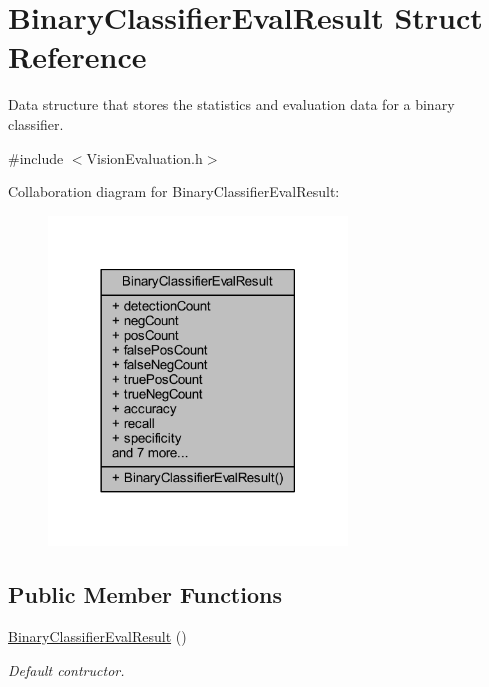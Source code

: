 \hypertarget{struct_vision_core_1_1_evaluation_1_1_binary_classifier_eval_result}{}\section{Binary\+Classifier\+Eval\+Result Struct Reference}
\label{struct_vision_core_1_1_evaluation_1_1_binary_classifier_eval_result}


Data structure that stores the statistics and evaluation data for a binary classifier.  




{\ttfamily \#include $<$Vision\+Evaluation.\+h$>$}



Collaboration diagram for Binary\+Classifier\+Eval\+Result\+:
\nopagebreak
\begin{figure}[H]
\begin{center}
\leavevmode
\includegraphics[width=225pt]{struct_vision_core_1_1_evaluation_1_1_binary_classifier_eval_result__coll__graph}
\end{center}
\end{figure}
\subsection*{Public Member Functions}
\begin{DoxyCompactItemize}
\item 
\hypertarget{struct_vision_core_1_1_evaluation_1_1_binary_classifier_eval_result_a56ffb62efd16fc45f18938e1fcdb2375}{}\hyperlink{struct_vision_core_1_1_evaluation_1_1_binary_classifier_eval_result_a56ffb62efd16fc45f18938e1fcdb2375}{Binary\+Classifier\+Eval\+Result} ()\label{struct_vision_core_1_1_evaluation_1_1_binary_classifier_eval_result_a56ffb62efd16fc45f18938e1fcdb2375}

\begin{DoxyCompactList}\small\item\em Default contructor. \end{DoxyCompactList}\end{DoxyCompactItemize}
